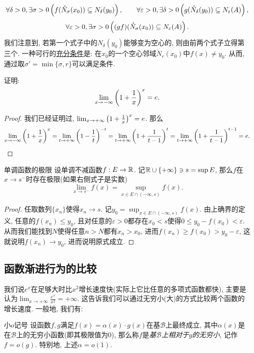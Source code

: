 $$\forall \delta >0, \exists \sigma >0 \left( f(\mathring{N}_{\sigma} (x_0)) \subseteq N_{\delta} (y_0) \right),\qquad \forall \varepsilon >0, \exists \delta >0 \left( g(\mathring{N}_{\delta} (y_0)) \subseteq N_{\varepsilon} (A) \right),$$
$$\forall \varepsilon >0, \exists \sigma >0 \left( (gf)(\mathring{N}_{\sigma} (x_0)) \subseteq N_{\varepsilon} (A) \right).$$ 
我们注意到, 若第一个式子中的$N_{\delta} (y_0)$能够变为空心的, 则由前两个式子立得第三个. 一种可行的\underline{充分条件}是: 在$x_0$的一个空心邻域$\mathring{N}_{r}(x_0)$中$f(x) \neq y_0$. 从而, 通过取$\sigma ' =\min \{\sigma , r\}$可以满足条件. 

\begin{example}
	证明: $$\lim_{x\to -\infty} \left( 1+\frac{1}{x} \right)^x = e.$$
\end{example}
\begin{proof}
	我们已经证明过, $\lim_{x\to +\infty} \left( 1+\frac{1}{x} \right)^x = e$. 那么$$\lim_{x\to -\infty} \left( 1+\frac{1}{x} \right)^x = \lim_{t\to +\infty} \left( 1-\frac{1}{t} \right)^{-t} = \lim_{t\to +\infty} \left( 1+\frac{1}{t-1} \right)^{t} = \lim_{t\to +\infty} \left( 1+\frac{1}{t-1} \right)^{t-1} = e. $$
\end{proof}

\begin{theorem}{单调函数的极限}{\label{thm:djdnhjuudejixm}}
	设单调不减函数$f:E \to \mathbb{R}$. 记$\mathbb{R} \cup \{+\infty \} \ni s = \sup E$, 那么$f$在$x \to s^-$时存在极限(如果右侧式子是实数)$$\lim_{x \to s^-} f(x) = \sup_{x \in E \cap (-\infty ,s)} f(x) .$$
\end{theorem}
\begin{proof}
	任取数列$\{ x_n \}$使得$x_n \to s$. 记$y_0 = \sup_{x \in E \cap (-\infty ,s)} f(x)$. 由上确界的定义, 任意的$f(x_n) \leq y_0$, 且对任意的$\varepsilon >0$都存在$x_0 < s$使得$0 \leq y_0-f(x_0) <\varepsilon$. 从而我们能找到$N$使得任意$n>N$都有$x_n>x_0$, 进而$f(x_n) \geq f(x_0) > y_0-\varepsilon$, 这就说明$f(x_n) \to y_0$, 进而说明原式成立. 
\end{proof}

\subsection{函数渐进行为的比较}

我们说$e^x$在足够大时比$x^2$增长速度快(实际上它比任意的多项式函数都快), 主要是认为$\lim_{x\to +\infty} \frac{e^x}{x^2} = +\infty$. 这告诉我们可以通过无穷小(大)的方式比较两个函数的增长速度. 一般地, 我们有: 

\begin{definition}{小$o$记号}
	设函数$f,g$满足$f(x) = \alpha (x) \cdot g(x)$在基$\mathcal{B}$上最终成立, 其中$\alpha (x)$是在$\mathcal{B}$上的无穷小函数(即其极限值为$0$), 那么称$f$是\textit{基$\mathcal{B}$上相对于$g$的无穷小}, 记作$f=o(g)$. 特别地, 上述$\alpha = o(1)$. 
\end{definition}

